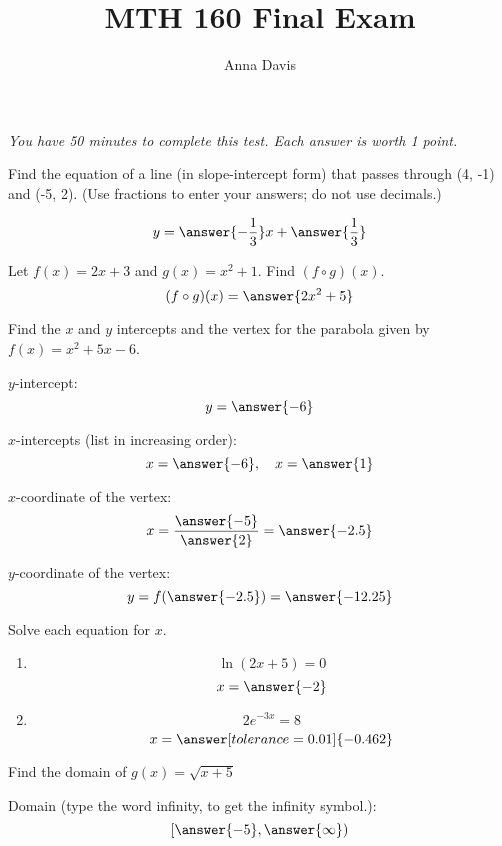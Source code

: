 \documentclass{ximera}
\author{Anna Davis} \title{MTH 160 Final Exam}
\begin{document}
\begin{abstract}

\end{abstract}
\maketitle
 \textit{You have 50 minutes to complete this test.  Each answer is worth 1 point.}
 \begin{problem}\label{prob:160finalprob1}
 Find the equation of a line (in slope-intercept form) that passes through (4, -1) and (-5, 2).  (Use fractions to enter your answers; do not use decimals.)
 
 $$y=\answer{-\frac{1}{3}}x+\answer{\frac{1}{3}}$$
 
\end{problem}

\begin{problem}\label{prob:160finalprob2}
 Let $f(x)=2x+3$ and $g(x)=x^2+1$.  Find $(f\circ g)(x)$.
 $$(f\circ g)(x)=\answer{2x^2+5}$$
 
\end{problem}

\begin{problem}\label{prob:160finalprob3}
Find the $x$ and $y$ intercepts and the vertex for the parabola given by $f(x)=x^2+5x-6$. 

$y$-intercept:
$$y=\answer{-6}$$

$x$-intercepts (list in increasing order):
$$x=\answer{-6},\quad x=\answer{1}$$

$x$-coordinate of the vertex:
$$x=\frac{\answer{-5}}{\answer{2}}=\answer{-2.5}$$

$y$-coordinate of the vertex:
$$y=f(\answer{-2.5})=\answer{-12.25}$$


\end{problem}

\begin{problem}\label{prob:160finalprob4}
Solve each equation for $x$.
  \begin{enumerate}
\item
$$\ln(2x+5)=0$$
$$x=\answer{-2}$$
\item
$$2e^{-3x}=8$$
$$x=\answer[tolerance=0.01]{-0.462}$$
  \end{enumerate}
\end{problem}

\begin{problem}\label{prob:160finalprob5}
Find the domain of $g(x) = \sqrt{x+5}$

Domain (type the word infinity, to get the infinity symbol.):
$$[\answer{-5}, \answer{\infty})$$

\end{problem}
\end{document}
